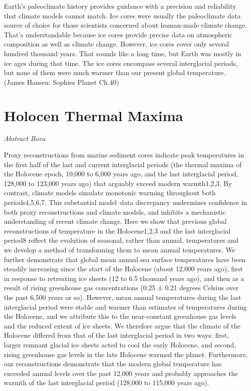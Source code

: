 \documentclass[
]{book}
\begin{document}
Earth's paleoclimate history provides guidance with a precision and reliability that climate
models cannot match. Ice cores were usually the paleoclimate data source of choice for those
scientists concerned about human-made climate change. That's understandable because ice
cores provide precise data on atmospheric composition as well as climate change.
However, ice cores cover only several hundred thousand years. That sounds like a long time, but
Earth was mostly in ice ages during that time. The ice cores encompass several interglacial
periods, but none of them were much warmer than our present global temperature.
(James Hansen: Sophies Planet Ch.40)

\hypertarget{holocen-thermal-maxima}{%
\section{Holocen Thermal Maxima}\label{holocen-thermal-maxima}}

\emph{Abstract Bova}

Proxy reconstructions from marine sediment cores indicate peak temperatures in the first half of the last and current interglacial periods (the thermal maxima of the Holocene epoch, 10,000 to 6,000 years ago, and the last interglacial period, 128,000 to 123,000 years ago) that arguably exceed modern warmth1,2,3. By contrast, climate models simulate monotonic warming throughout both periods4,5,6,7. This substantial model--data discrepancy undermines confidence in both proxy reconstructions and climate models, and inhibits a mechanistic understanding of recent climate change. Here we show that previous global reconstructions of temperature in the Holocene1,2,3 and the last interglacial period8 reflect the evolution of seasonal, rather than annual, temperatures and we develop a method of transforming them to mean annual temperatures. We further demonstrate that global mean annual sea surface temperatures have been steadily increasing since the start of the Holocene (about 12,000 years ago), first in response to retreating ice sheets (12 to 6.5 thousand years ago), and then as a result of rising greenhouse gas concentrations (0.25 ± 0.21 degrees Celsius over the past 6,500 years or so). However, mean annual temperatures during the last interglacial period were stable and warmer than estimates of temperatures during the Holocene, and we attribute this to the near-constant greenhouse gas levels and the reduced extent of ice sheets. We therefore argue that the climate of the Holocene differed from that of the last interglacial period in two ways: first, larger remnant glacial ice sheets acted to cool the early Holocene, and second, rising greenhouse gas levels in the late Holocene warmed the planet. Furthermore, our reconstructions demonstrate that the modern global temperature has exceeded annual levels over the past 12,000 years and probably approaches the warmth of the last interglacial period (128,000 to 115,000 years ago).
\end{document}
